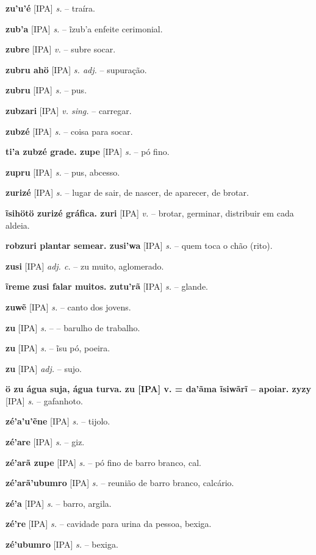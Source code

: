 {{{{\textbf{zu'u'é} [IPA] \textit{s.} -- traíra.

\textbf{zub'a} [IPA] \textit{s.} -- ĩzub'a enfeite cerimonial.

\textbf{zubre} [IPA] \textit{v.} -- subre socar.

\textbf{zubru ahö} [IPA] \textit{s. adj.} -- supuração.

\textbf{zubru} [IPA] \textit{s.} -- pus.

\textbf{zubzari} [IPA] \textit{v. sing.} -- carregar.

\textbf{zubzé} [IPA] \textit{s.} -- coisa para socar.

\textbf{ti'a zubzé grade. zupe} [IPA] \textit{s.} -- pó fino.

\textbf{zupru} [IPA] \textit{s.} -- pus, abcesso.

\textbf{zurizé} [IPA] \textit{s.} -- lugar de sair, de nascer, de aparecer, de brotar.

\textbf{ĩsihötö zurizé gráfica. zuri} [IPA] \textit{v.} -- brotar, germinar, distribuir em cada aldeia.

\textbf{robzuri plantar  semear. zusi'wa} [IPA] \textit{s.} -- quem toca o chão (rito).

\textbf{zusi} [IPA] \textit{adj. c.} -- zu muito, aglomerado.

\textbf{ĩreme zusi falar muitos. zutu'rã} [IPA] \textit{s.} -- glande.

\textbf{zuwẽ} [IPA] \textit{s.} -- canto dos jovens.

\textbf{zu} [IPA] \textit{s.} -- -- barulho de trabalho.

\textbf{zu} [IPA] \textit{s.} -- ĩsu pó, poeira.

\textbf{zu} [IPA] \textit{adj.} -- sujo.

\textbf{ö zu água suja, água turva. zu [IPA] v. = da'ãma ĩsiwãrĩ -- apoiar. zyzy} [IPA] \textit{s.} -- gafanhoto.

\textbf{zé'a'u'ẽne} [IPA] \textit{s.} -- tijolo.

\textbf{zé'are} [IPA] \textit{s.} -- giz.

\textbf{zé'arã zupe} [IPA] \textit{s.} -- pó fino de barro branco, cal.

\textbf{zé'arã'ubumro} [IPA] \textit{s.} -- reunião de barro branco, calcário.

\textbf{zé'a} [IPA] \textit{s.} -- barro, argila.

\textbf{zé're} [IPA] \textit{s.} -- cavidade para urina da pessoa, bexiga.

\textbf{zé'ubumro} [IPA] \textit{s.} -- bexiga.

}}}}
